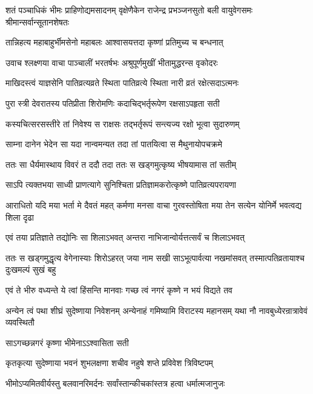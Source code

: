\threelineshloka
{शतं पञ्चाधिकं भीमः प्राहिणोद्यमसादनम्}
{वृक्षेणैकेन राजेन्द्र प्रभञ्जनसुतो बली}
{वायुवेगसमः श्रीमान्सर्वान्सूतानशेषतः}


\twolineshloka
{तान्निहत्य महाबाहुर्भीमसेनो महाबलः}
{आश्वासयत्तदा कृष्णां प्रतिमुच्य च बन्धनात्}


\twolineshloka
{उवाच श्लक्ष्णया वाचा पाञ्चालीं भरतर्षभः}
{अश्रुपूर्णमुखीं भीतामुद्धरन्स वृकोदरः}


\twolineshloka
{माखिदस्त्वं याज्ञसेनि पातिव्रत्यव्रते स्थिता}
{पातिव्रत्ये स्थिता नारी व्रतं रक्षेत्सदाऽत्मनः}


\twolineshloka
{पुरा स्त्री देवरातस्य पतिप्रीता शिरोमणिः}
{कदाचिद्भर्तृरूपेण रक्षसाऽपहृता सती}


\twolineshloka
{कस्यचित्सरसस्तीरे तां निवेश्य स राक्षसः}
{तद्भर्तृरूपं सन्त्यज्य रक्षो भूत्वा सुदारुणम्}


\twolineshloka
{साम्ना दानेन भेदेन सा यदा नान्वमन्यत}
{तदा तां पातयित्वा स मैथुनायोपचक्रमे}


\twolineshloka
{ततः सा धैर्यमास्थाय विवरं त ददौ तदा}
{ततः स खड्गमुत्कृष्य भीषयामास तां सतीम्}


\twolineshloka
{साऽपि त्यक्तभया साध्वी प्राणत्यागे सुनिश्चिता}
{प्रतिज्ञामकरोत्कृष्णे पातिव्रत्यपरायणा}


\threelineshloka
{आराधितो यदि मया भर्ता मे दैवतं महत्}
{कर्मणा मनसा वाचा गुरवस्तोषिता मया}
{तेन सत्येन योनिर्मे भवत्वद्य शिला दृढा}


\twolineshloka
{एवं तया प्रतिज्ञाते तद्योनिः सा शिलाऽभवत्}
{अन्तरा नाभिजान्वोर्यत्तत्सर्वं च शिलाऽभवत्}


\onelineshloka
{ततः स खड्गमुद्धृत्य वेगेनास्याः शिरोऽहरत्}
\twolineshloka
{जया नाम सखी साऽभूत्पार्वत्या नखमांसवत्}
{तस्मात्पतिव्रतायाश्च दुःखमल्पं सुखं बहु}


\twolineshloka
{एवं ते भीरु वध्यन्ते ये त्वां हिंसन्ति मानवाः}
{गच्छ त्वं नगरं कृष्णे न भयं विद्यते तव}


\threelineshloka
{अन्येन त्वं पथा शीघ्रं सुदेष्णाया निवेशनम्}
{अन्येनाहं गमिष्यामि विराटस्य महानसम्}
{यथा नौ नावबुध्येरन्रात्रावेवं व्यवस्थितौ}



\onelineshloka
{साऽगच्छन्नगरं कृष्णा भीमेनाऽऽश्वासिता सती}

\twolineshloka
{कृतकृत्या सुदेष्णाया भवनं शुभलक्षणा}
{शचीव नहुषे शप्ते प्रविवेश त्रिविष्टपम्}

\twolineshloka
{भीमोऽप्यमितवीर्यस्तु बलवानरिमर्दनः}
{सर्वांस्तान्कीचकांस्तत्र हत्वा धर्मात्मजानुजः}

